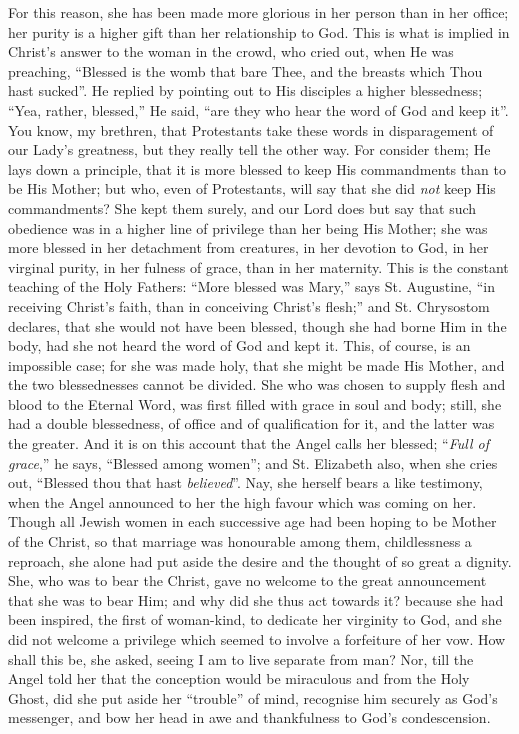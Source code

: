 For this reason, she has been made more glorious in her person than
in her office; her purity is a higher gift than her relationship to
God. This is what is implied in Christ's answer to the woman in the
crowd, who cried out, when He was preaching, ``Blessed is the womb
that bare Thee, and the breasts which Thou hast sucked''. He
replied by pointing out to His disciples a higher blessedness;
``Yea, rather, blessed,'' He said, ``are they who hear the
word of God and keep it''. You know, my brethren, that Protestants
take these words in disparagement of our Lady's greatness, but they
really tell the other way. For consider them; He lays down a
principle, that it is more blessed to keep His commandments than to be
His Mother; but who, even of Protestants, will say that she did \emph{not}
keep His commandments? She kept them surely, and our Lord does but say
that such obedience was in a higher line of privilege than her being
His Mother; she was more blessed in her detachment from creatures, in
her devotion to God, in her virginal purity, in her fulness of grace,
than in her maternity. This is the constant teaching of the Holy
Fathers: ``More blessed was Mary,'' says St. Augustine,
``in receiving Christ's faith, than in conceiving Christ's
flesh;'' and St. Chrysostom declares, that she would not have been
blessed, though she had borne Him in the body, had she not heard the
word of God and kept it. This, of course, is an impossible case; for
she was made holy, that she might be made His Mother, and the two
blessednesses cannot be divided. She who was chosen to supply flesh
and blood to the Eternal Word, was first filled with grace in soul and
body; still, she had a double blessedness, of office and of
qualification for it, and the latter was the greater. And it is on
this account that the Angel calls her blessed; ``\emph{Full of grace},''
he says, ``Blessed among women''; and St. Elizabeth also,
when she cries out, ``Blessed thou that hast \emph{believed}''.
Nay, she herself bears a like testimony, when the Angel announced to
her the high favour which was coming on her. Though all Jewish women
in each successive age had been hoping to be Mother of the Christ, so
that marriage was honourable among them, childlessness a reproach, she
alone had put aside the desire and the thought of so great a dignity.
She, who was to bear the Christ, gave no welcome to the great
announcement that she was to bear Him; and why did she thus act
towards it? because she had been inspired, the first of woman-kind, to
dedicate her virginity to God, and she did not welcome a privilege
which seemed to involve a forfeiture of her vow. How shall this be,
she asked, seeing I am to live separate from man? Nor, till the Angel
told her that the conception would be miraculous and from the Holy
Ghost, did she put aside her ``trouble'' of mind, recognise
him securely as God's messenger, and bow her head in awe and
thankfulness to God's condescension.

